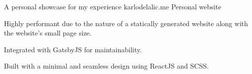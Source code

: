 \begin{cventries}

\cventry
{A personal showcase for my experience} %
{karlodelalic.me \href{https://github.com/kdelalic/karlodelalic.com-gatsby}{\faGithub}} %
{Personal website}
{}
{ %
\begin{cvitems}
\item {Highly performant due to the nature of a statically generated website along with the website's small page size.}
\item {Integrated with GatsbyJS for maintainability.}
\item {Built with a minimal and seamless design using ReactJS and SCSS.}
\end{cvitems}
}


\end{cventries}